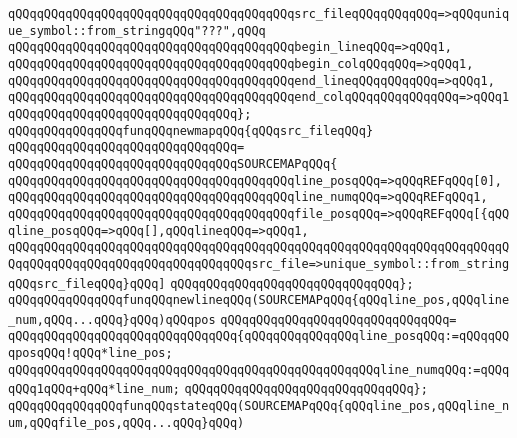 \verb|qQQqqQQqqQQqqQQqqQQqqQQqqQQqqQQqqQQqqQQqsrc_fileqQQqqQQqqQQq=>qQQqunique_symbol::from_stringqQQq"???",qQQq|\newline
\verb|qQQqqQQqqQQqqQQqqQQqqQQqqQQqqQQqqQQqqQQqbegin_lineqQQq=>qQQq1,|\newline
\verb|qQQqqQQqqQQqqQQqqQQqqQQqqQQqqQQqqQQqqQQqbegin_colqQQqqQQq=>qQQq1,|\newline
\verb|qQQqqQQqqQQqqQQqqQQqqQQqqQQqqQQqqQQqqQQqend_lineqQQqqQQqqQQq=>qQQq1,|\newline
\verb|qQQqqQQqqQQqqQQqqQQqqQQqqQQqqQQqqQQqqQQqend_colqQQqqQQqqQQqqQQq=>qQQq1|\newline
\verb|qQQqqQQqqQQqqQQqqQQqqQQqqQQqqQQq};|\newline
\newline
\verb|qQQqqQQqqQQqqQQqfunqQQqnewmapqQQq{qQQqsrc_fileqQQq}|\newline
\verb|qQQqqQQqqQQqqQQqqQQqqQQqqQQqqQQq=|\newline
\verb|qQQqqQQqqQQqqQQqqQQqqQQqqQQqqQQqSOURCEMAPqQQq{|\newline
\verb|qQQqqQQqqQQqqQQqqQQqqQQqqQQqqQQqqQQqqQQqline_posqQQq=>qQQqREFqQQq[0],|\newline
\verb|qQQqqQQqqQQqqQQqqQQqqQQqqQQqqQQqqQQqqQQqline_numqQQq=>qQQqREFqQQq1,|\newline
\verb|qQQqqQQqqQQqqQQqqQQqqQQqqQQqqQQqqQQqqQQqfile_posqQQq=>qQQqREFqQQq[{qQQqline_posqQQq=>qQQq[],qQQqlineqQQq=>qQQq1,|\newline
\verb|qQQqqQQqqQQqqQQqqQQqqQQqqQQqqQQqqQQqqQQqqQQqqQQqqQQqqQQqqQQqqQQqqQQqqQQqqQQqqQQqqQQqqQQqqQQqqQQqqQQqqQQqsrc_file=>unique_symbol::from_stringqQQqsrc_fileqQQq}qQQq]|\newline
\verb|qQQqqQQqqQQqqQQqqQQqqQQqqQQqqQQq};|\newline
\newline
\verb|qQQqqQQqqQQqqQQqfunqQQqnewlineqQQq(SOURCEMAPqQQq{qQQqline_pos,qQQqline_num,qQQq...qQQq}qQQq)qQQqpos|\newline
\verb|qQQqqQQqqQQqqQQqqQQqqQQqqQQqqQQq=|\newline
\verb|qQQqqQQqqQQqqQQqqQQqqQQqqQQqqQQq{qQQqqQQqqQQqqQQqline_posqQQq:=qQQqqQQqposqQQq!qQQq*line_pos;|\newline
\verb|qQQqqQQqqQQqqQQqqQQqqQQqqQQqqQQqqQQqqQQqqQQqqQQqqQQqline_numqQQq:=qQQqqQQq1qQQq+qQQq*line_num;|\newline
\verb|qQQqqQQqqQQqqQQqqQQqqQQqqQQqqQQq};|\newline
\newline
\verb|qQQqqQQqqQQqqQQqfunqQQqstateqQQq(SOURCEMAPqQQq{qQQqline_pos,qQQqline_num,qQQqfile_pos,qQQq...qQQq}qQQq)|\newline
